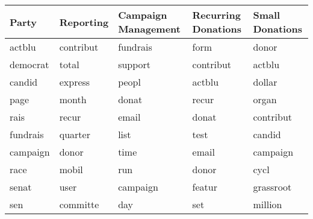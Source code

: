 \begin{tabular}{lllll}
  \toprule
Party & Reporting & Campaign Management & Recurring Donations & Small Donations \\ 
  \midrule
actblu & contribut & fundrais & form & donor \\ 
  democrat & total & support & contribut & actblu \\ 
  candid & express & peopl & actblu & dollar \\ 
  page & month & donat & recur & organ \\ 
  rais & recur & email & donat & contribut \\ 
  fundrais & quarter & list & test & candid \\ 
  campaign & donor & time & email & campaign \\ 
  race & mobil & run & donor & cycl \\ 
  senat & user & campaign & featur & grassroot \\ 
  sen & committe & day & set & million \\ 
   \bottomrule
\end{tabular}
